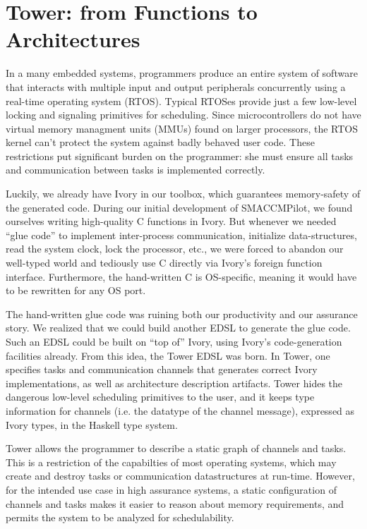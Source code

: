 \section{Tower: from Functions to Architectures}
\label{sec:tower}

In a many embedded systems, programmers produce an entire system of software
that interacts with multiple input and output peripherals concurrently using a
real-time operating system (RTOS). Typical RTOSes provide just a few low-level
locking and signaling primitives for scheduling. Since microcontrollers do not
have virtual memory managment units (MMUs) found on larger processors, the RTOS
kernel can't protect the system against badly behaved user code. These
restrictions put significant burden on the programmer: she must ensure all tasks
and communication between tasks is implemented correctly.

Luckily, we already have Ivory in our toolbox, which guarantees memory-safety of
the generated code. During our initial development of SMACCMPilot, we found
ourselves writing high-quality C functions in Ivory.  But whenever we needed
``glue code'' to implement inter-process communication, initialize
data-structures, read the system clock, lock the processor, etc., we were forced
to abandon our well-typed world and tediously use C directly via Ivory's foreign
function interface.  Furthermore, the hand-written C is OS-specific, meaning it
would have to be rewritten for any OS port.

The hand-written glue code was ruining both our productivity and our assurance
story.  We realized that we could build another EDSL to generate the glue code.
Such an EDSL could be built on ``top of'' Ivory, using Ivory's code-generation
facilities already.  From this idea, the Tower EDSL was born.  In Tower, one
specifies tasks and communication channels that generates correct Ivory
implementations, as well as architecture description artifacts. Tower hides the
dangerous low-level scheduling primitives to the user, and it keeps type
information for channels (i.e. the datatype of the channel message), expressed
as Ivory types, in the Haskell type system.

Tower allows the programmer to describe a static graph of channels and tasks.
This is a restriction of the capabilties of most operating systems, which may
create and destroy tasks or communication datastructures at run-time. However,
for the intended use case in high assurance systems, a static configuration of
channels and tasks makes it easier to reason about memory requirements, and
permits the system to be analyzed for schedulability.

